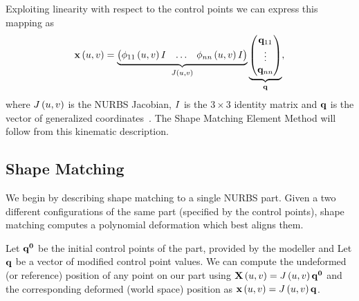 Exploiting linearity with respect to the control points  we can express this mapping as 
\begin{equation}
    \mathbf{x}\left(u,v\right) = \underbrace{\begin{pmatrix} \phi_{11}\left(u,v\right)I & \dots & \phi_{nn}\left(u,v\right)I \end{pmatrix}}_{J\left(u,v\right)}
    \underbrace{\begin{pmatrix} \mathbf{q}_{11} \\ \vdots \\ \mathbf{q}_{nn}\end{pmatrix}}_{\mathbf{q}},
\end{equation} where $J\left(u,v\right)$ is the NURBS Jacobian, $I$ is the $3\times3$ identity matrix and $\mathbf{q}$ is the vector of generalized coordinates~.
The Shape Matching Element Method will follow from this kinematic description.

\subsection{Shape Matching}
\label{sec:shapematching}

We begin by describing shape matching to a single NURBS part. 
Given a two different configurations of the same part (specified by the control points), shape matching computes a polynomial deformation which best aligns them.

Let $\mathbf{q^0}$ be the initial control points of the part, provided by the modeller and Let $\mathbf{q}$ be a vector of modified control point values.
We can compute the undeformed (or reference) position of any point on our part using $\mathbf{X}\left(u,v\right) = J\left(u,v\right)\mathbf{q^0}$ and the corresponding
deformed (world space) position as $\mathbf{x}\left(u,v\right) = J\left(u,v\right)\mathbf{q}$.

